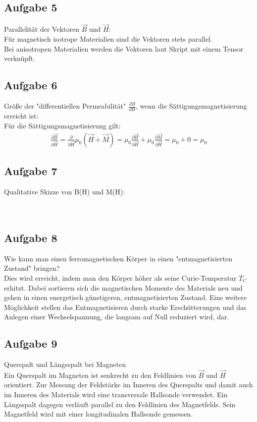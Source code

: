 \documentclass[a4paper,10pt]{scrartcl}
\begin{document}
\subsection{Aufgabe 5}
Parallelität der Vektoren $\vec{B}$ und $\vec{H}$: \\
Für magnetisch isotrope Materialien sind die Vektoren stets parallel. \\
Bei anisotropen Materialien werden die Vektoren laut Skript mit einem Tensor verknüpft.
\subsection{Aufgabe 6}
Größe der "differentiellen Permeabilität" $\frac{\partial B}{\partial H}$, wenn die Sättigungsmagnetisierung erreicht ist: \\
Für die Sättigungsmagnetisierung gilt: \\
\begin{align*}
\frac{\partial \vec{B}}{\partial \vec{H}} = \frac{\partial}{\partial \vec{H}} \mu_0 (\vec{H} + \vec{M}) = \mu_0 \frac{\partial \vec{H}}{\partial \vec{H}}+ \mu_{0} \frac{\partial \vec{M}}{\partial \vec{H}} = \mu_0 + 0 = \mu_0 
\end{align*}
\subsection{Aufgabe 7}
Qualitative Skizze von B(H) und M(H): \\ \\ \\
\subsection{Aufgabe 8}
Wie kann man einen ferromagnetischen Körper in einen "entmagnetisierten Zustand" bringen? \\
Dies wird erreicht, indem man den Körper höher als seine Curie-Temperatur $T_C$ erhitzt. Dabei sortieren sich die magnetischen Momente des Materials neu und gehen in einen energetisch günstigeren, entmagnetisierten Zustand. Eine weitere Möglichkeit stellen das Entmagnetisieren durch starke Erschütterungen und das Anlegen einer Wechselspannung, die langsam auf Null reduziert wird, dar.
\subsection{Aufgabe 9}
Querspalt und Längsspalt bei Magneten \\
Ein Querspalt im Magneten ist senkrecht zu den Feldlinien von $\vec{B}$ und $\vec{H}$ orientiert. Zur Messung der Feldstärke im Inneren des Querspalts und damit auch im Inneren des Materials wird eine transversale Hallsonde verwendet.
Ein Längsspalt dagegen verläuft parallel zu den Feldlinien des Magnetfelds. Sein Magnetfeld wird mit einer longitudinalen Hallsonde gemessen.
\end{document}
